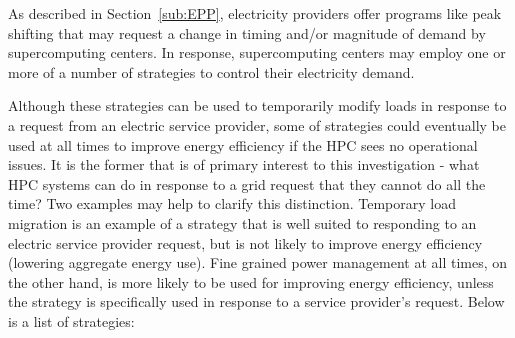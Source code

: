 As described in Section~\ref{sub:EPP}, electricity providers offer programs like peak shifting that may request 
a change in timing and/or magnitude of demand by supercomputing centers.  
In response, supercomputing centers may employ one or more of a number of strategies to control their 
electricity demand.

Although these strategies can be used to temporarily modify loads in response to a request from an 
electric service provider, some of strategies could eventually be used at all times to improve energy 
efficiency if the HPC sees no operational issues. It is the former that is of primary interest to this 
investigation - what HPC systems can do in response to a grid request that they cannot do all the time? 
Two examples may help to clarify this distinction. Temporary load migration is an example of a strategy 
that is well suited to responding to an electric service provider request, but is not likely to improve 
energy efficiency (lowering aggregate energy use). Fine grained power management at all times, on 
the other hand, is more likely to be used for improving energy efficiency, unless the strategy is 
specifically used in response to a service provider's request. 
Below is a list of strategies:

